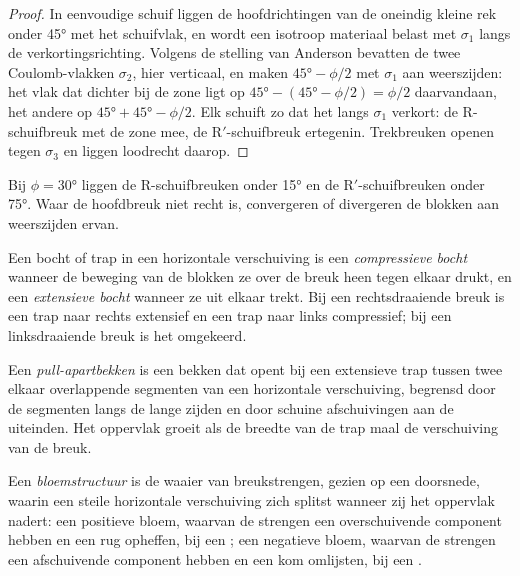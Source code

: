\begin{proof}
In eenvoudige schuif liggen de hoofdrichtingen van de oneindig kleine rek onder
\ang{45} met het schuifvlak, en wordt een isotroop materiaal belast met
$\sigma_1$ langs de verkortingsrichting. Volgens de stelling van Anderson bevatten de
twee Coulomb-vlakken $\sigma_2$, hier verticaal, en maken $\ang{45} - \phi/2$ met
$\sigma_1$ aan weerszijden: het vlak dat dichter bij de zone ligt op $\ang{45} -
(\ang{45} - \phi/2) = \phi/2$ daarvandaan, het andere op $\ang{45} + \ang{45} -
\phi/2$. Elk schuift zo dat het langs $\sigma_1$ verkort: de R-schuifbreuk met de
zone mee, de R$'$-schuifbreuk ertegenin. Trekbreuken openen tegen $\sigma_3$ en
liggen loodrecht daarop.
\end{proof}

Bij $\phi = \ang{30}$ liggen de R-schuifbreuken onder \ang{15} en de R$'$-schuifbreuken
onder \ang{75}. Waar de hoofdbreuk niet recht is, convergeren of divergeren de
blokken aan weerszijden ervan.

\begin{definition}\label{def:b3:extension-strike-slip:bends}
Een bocht of trap in een horizontale verschuiving is een \emph{compressieve
bocht} wanneer de beweging van de blokken ze
over de breuk heen tegen elkaar drukt, en een \emph{extensieve bocht} wanneer
ze uit elkaar trekt. Bij een rechtsdraaiende breuk is een trap naar rechts extensief en een
trap naar links compressief; bij een linksdraaiende breuk is het omgekeerd.
\end{definition}

\begin{definition}\label{def:b3:extension-strike-slip:pull-apart}
Een \emph{pull-apartbekken} is een bekken dat opent bij een
extensieve trap tussen twee elkaar overlappende segmenten van een horizontale verschuiving,
begrensd door de segmenten langs de lange zijden en door schuine afschuivingen aan de uiteinden.
Het oppervlak groeit als de breedte van de trap maal de verschuiving van de breuk.
\end{definition}

\begin{definition}[Bloemstructuur]\label{def:b3:extension-strike-slip:flower}
Een \emph{bloemstructuur} is de waaier van breukstrengen,
gezien op een doorsnede, waarin een steile horizontale verschuiving zich splitst wanneer
zij het oppervlak nadert: een positieve bloem, waarvan de strengen een overschuivende
component hebben en een rug opheffen, bij een ; een negatieve bloem,
waarvan de strengen een afschuivende component hebben en een kom omlijsten, bij een .
\end{definition}

